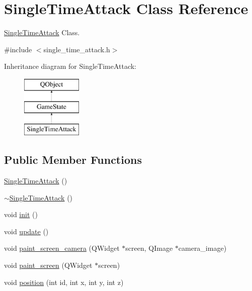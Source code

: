 \hypertarget{class_single_time_attack}{\section{Single\-Time\-Attack Class Reference}
\label{class_single_time_attack}
}


\hyperlink{class_single_time_attack}{Single\-Time\-Attack} Class.  




{\ttfamily \#include $<$single\-\_\-time\-\_\-attack.\-h$>$}

Inheritance diagram for Single\-Time\-Attack\-:\begin{figure}[H]
\begin{center}
\leavevmode
\includegraphics[height=3.000000cm]{class_single_time_attack}
\end{center}
\end{figure}
\subsection*{Public Member Functions}
\begin{DoxyCompactItemize}
\item 
\hyperlink{class_single_time_attack_a603826ff86d46ae1636ccc54930f495b}{Single\-Time\-Attack} ()
\item 
\hyperlink{class_single_time_attack_a2f0a6a904ce2462396882cf084939c1e}{$\sim$\-Single\-Time\-Attack} ()
\item 
void \hyperlink{class_single_time_attack_a81502ff90ce10b8ed674a1f86cdafa2a}{init} ()
\item 
void \hyperlink{class_single_time_attack_ab906c638bd4786669217deee446f3d4f}{update} ()
\item 
void \hyperlink{class_single_time_attack_acdd35eace2509b7ae507eb15059682b5}{paint\-\_\-screen\-\_\-camera} (Q\-Widget $\ast$screen, Q\-Image $\ast$camera\-\_\-image)
\item 
void \hyperlink{class_single_time_attack_aa4f8bb5ccef49a83f9c24953c4fe2d8b}{paint\-\_\-screen} (Q\-Widget $\ast$screen)
\item 
void \hyperlink{class_single_time_attack_a2c5d2f9a6f16f11e00bbdd674562048f}{position} (int id, int x, int y, int z)
\end{DoxyCompactItemize}
